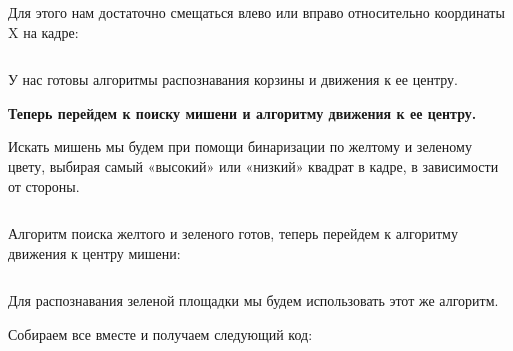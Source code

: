 Для этого нам достаточно смещаться влево или вправо относительно координаты X на кадре: 

\inputminted[fontsize=\footnotesize, linenos]{cpp}{final/command_tour/vrs/task_02/source_4.cpp}

У нас готовы алгоритмы распознавания корзины и движения к ее центру. 

\textbf{Теперь перейдем к поиску мишени и алгоритму движения к ее центру.} 

Искать мишень мы будем при помощи бинаризации по желтому и зеленому цвету, выбирая самый «высокий» или «низкий» квадрат в кадре, в зависимости от стороны.

\inputminted[fontsize=\footnotesize, linenos]{cpp}{final/command_tour/vrs/task_02/source_5.cpp}

Алгоритм поиска желтого и зеленого готов, теперь перейдем к алгоритму движения к центру мишени:

\inputminted[fontsize=\footnotesize, linenos]{cpp}{final/command_tour/vrs/task_02/source_6.cpp}

Для распознавания зеленой площадки мы будем использовать этот же алгоритм. 

Собираем все вместе и получаем следующий код:

\inputminted[fontsize=\footnotesize, linenos]{cpp}{final/command_tour/vrs/task_02/source_7.cpp}
